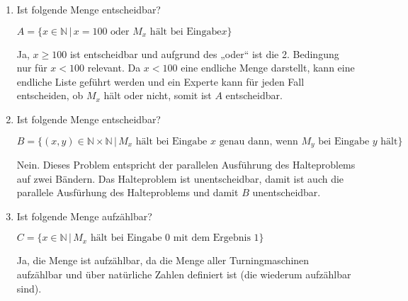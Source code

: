 \documentclass{bschlangaul-aufgabe}
\begin{document}
\begin{enumerate}


\item Ist folgende Menge entscheidbar?

$A = \{ x \in \mathbb{N} \,|\, x = 100 \text{ oder } M_x \text{ hält bei Eingabe
} x \}$

\begin{bAntwort}
Ja, $x \geq 100$ ist entscheidbar und aufgrund des „oder“ ist die 2.
Bedingung nur für $x < 100$ relevant. Da $x < 100$ eine endliche Menge
darstellt, kann eine endliche Liste geführt werden und ein Experte kann
für jeden Fall entscheiden, ob $M_x$ hält oder nicht, somit ist $A$
entscheidbar.
\end{bAntwort}


\item Ist folgende Menge entscheidbar?

$B = \{
(x, y) \in \mathbb{N} \times \mathbb{N}
\,| \,
M_x
\text{ hält bei Eingabe }
x
\text{ genau dann, wenn }
M_y
\text{ bei Eingabe }
y
\text{ hält}
\}$

\begin{bAntwort}
Nein. Dieses Problem entspricht der parallelen Ausführung des
Halteproblems auf zwei Bändern. Das Halteproblem ist unentscheidbar,
damit ist auch die parallele Ausfürhung des Halteproblems und damit $B$
unentscheidbar.
\end{bAntwort}


\item Ist folgende Menge aufzählbar?

$C = \{
x \in \mathbb{N}
\,|\,
M_x
\text{ hält bei Eingabe }
0
\text{ mit dem Ergebnis }
1
\}$

\begin{bAntwort}
Ja, die Menge ist aufzählbar, da die Menge aller Turningmaschinen
aufzählbar und über natürliche Zahlen definiert ist (die wiederum
aufzählbar sind).
\end{bAntwort}
\end{enumerate}
\end{document}
